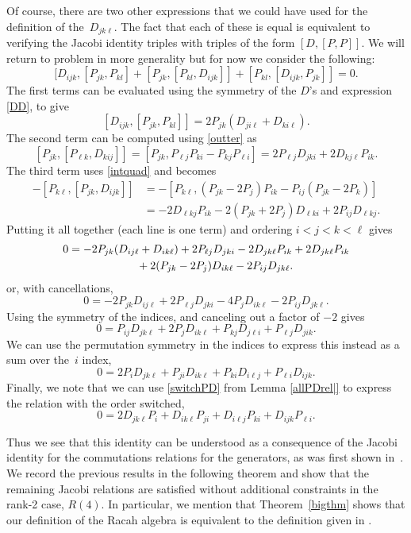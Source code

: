 \documentclass[10pt,a4paper]{amsart}
\numberwithin{equation}{section}
\begin{document}
Of course, there are two other expressions that we could have used for the definition of the~$D_{jk\ell}$. The fact that each of these is equal is equivalent to verifying the Jacobi identity triples with triples of the form $[D, [P, P]]$. We will return to problem in more generality but for now we consider the following:
\[
[ D_{ijk}, [P_{jk}, P_{kl}]+ [ P_{jk}, [ P_{kl}, D_{ijk}]]+[P_{kl}, [ D_{ijk}, P_{jk}]]=0 .
\]
The first terms can be evaluated using the symmetry of the $D$'s and expression \eqref{DD}, to give
\[
[ D_{ijk}, [P_{jk}, P_{kl}]]= 2P_{jk}( D_{ji\ell}+D_{ki\ell}).
\]
The second term can be computed using \eqref{outter} as
\[ [ P_{jk}, [ P_{\ell k}, D_{kij}]] = [P_{jk}, P_{\ell j}P_{ki} - P_{kj}P_{\ell i}] = 2P_{\ell j} D_{jki}+2D_{kj\ell} P_{ik}.\]
The third term uses \eqref{intquad} and becomes
\begin{align*}
-[P_{k\ell}, [ P_{jk}, D_{ijk}]] &= -[P_{k\ell},( P_{jk}-2P_j)P_{ik} - P_{ij}(P_{jk}-2P_{k})]\\
&= -2D_{\ell kj}P_{ik} -2(P_{jk} +2P_j)D_{\ell k i}+2P_{ij}D_{\ell k j}.
\end{align*}
Putting it all together (each line is one term) and ordering $i< j< k <\ell$ gives
\begin{gather*}
0 =  -2P_{jk}(D_{ ij \ell} +D_{ i k\ell})+2P_{\ell j} D_{jki}-2D_{jk\ell} P_{ik}
+2D_{jk\ell}P_{ik}\\
\hphantom{0=} +2(P_{jk} -2P_j)D_{ik \ell}-2P_{ij}D_{jk\ell} .
\end{gather*}
 or, with cancellations,
\[ 0 =-2P_{jk}D_{ ij \ell}+2P_{\ell j} D_{jki}-4P_jD_{ik \ell}-2P_{ij}D_{jk\ell} .\]
Using the symmetry of the indices, and canceling out a factor of $-2$ gives
\[
 0 =P_{ij}D_{jk\ell}+2P_jD_{i k \ell} +P_{kj}D_{ j \ell i}+P_{\ell j} D_{jik}.%
\]
We can use the permutation symmetry in the indices to express this instead as a sum over the~$i$ index,
\begin{equation}
 0 =2P_{i}D_{jk\ell}+P_{ji}D_{i k \ell} +P_{ki}D_{ i \ell j}+P_{\ell i} D_{ijk}\label{PDi}.
\end{equation}
Finally, we note that we can use \eqref{switchPD} from Lemma \ref{allPDrel|} to express the relation with the order switched,
\[%
0 =2D_{jk\ell}P_{i}+D_{i k \ell}P_{ji} +D_{ i \ell j}P_{ki}+ D_{ijk}P_{\ell i}.
\]

Thus we see that this identity can be understood as a consequence of the Jacobi identity for the commutations relations for the generators, as was first shown in~\cite{CGPAV22}. We record the previous results in the following theorem and show that the remaining Jacobi relations are satisfied without additional constraints in the rank-2 case, $R(4)$. In particular, we mention that Theorem~\ref{bigthm} shows that our definition of the Racah algebra is equivalent to the definition given in \cite{CGPAV22}.
\end{document}
